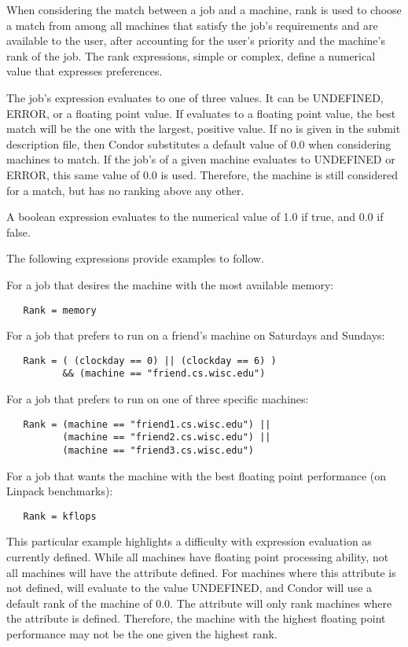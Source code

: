 When considering the match between a job and a machine, rank is used
to choose a match from among all machines that satisfy the job's
requirements and are available to the user, after accounting for
the user's priority and the machine's rank of the job.
The rank expressions, simple or complex, define a numerical value
that expresses preferences.

The job's  expression evaluates to one of three values.
It can be UNDEFINED, ERROR, or a floating point value.
If  evaluates to a floating point value,
the best match will be the one with the largest, positive value.
If no  is given 
in the submit description file,
then Condor substitutes a default value of 0.0 when considering
machines to match.
If the job's  of a given machine evaluates
to UNDEFINED or ERROR,
this same value of 0.0 is used.
Therefore, the machine is still considered for a match,
but has no ranking above any other.

A boolean expression evaluates to the numerical value of 1.0
if true, and 0.0 if false.

The following  expressions provide examples to
follow.

For a job that desires the machine with the most available memory:
\begin{verbatim}
   Rank = memory
\end{verbatim}

For a job that prefers to run on a friend's machine
on Saturdays and Sundays:
\begin{verbatim}
   Rank = ( (clockday == 0) || (clockday == 6) )
          && (machine == "friend.cs.wisc.edu")
\end{verbatim}

For a job that prefers to run on one of three specific machines:
\begin{verbatim}
   Rank = (machine == "friend1.cs.wisc.edu") ||
          (machine == "friend2.cs.wisc.edu") ||
          (machine == "friend3.cs.wisc.edu")
\end{verbatim}

For a job that wants the machine with the best floating point
performance (on Linpack benchmarks):
\begin{verbatim}
   Rank = kflops
\end{verbatim}
This particular example highlights a difficulty with  expression
evaluation as currently defined.
While all machines have floating point processing ability,
not all machines will have the  attribute defined.
For machines where this attribute is not defined,
 will evaluate to the value UNDEFINED, and
Condor will use a default rank of the machine of 0.0.
The  attribute will only rank machines where
the attribute is defined.
Therefore, the machine with the highest floating point
performance may not be the one given the highest rank.

